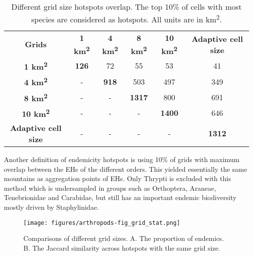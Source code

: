    \begin{table}[]
    \caption{Different grid size hotspots overlap. The top 10\% of cells with most species are considered as hotspots. All units are in km\textsuperscript{2}.}
\begin{tabular}{cccccc}
\textbf{Grids}              & \textbf{1 km\textsuperscript{2}} & \textbf{4 km\textsuperscript{2}} & \textbf{8 km\textsuperscript{2}} & \textbf{10 km\textsuperscript{2}} & \textbf{Adaptive cell size} \\
\textbf{1 km\textsuperscript{2}}              & \textbf{126}   & 72             & 55             & 53              & 41                          \\
\textbf{4 km\textsuperscript{2}}              & -              & \textbf{918}   & 503            & 497             & 349                         \\
\textbf{8 km\textsuperscript{2}}              & -              & -              & \textbf{1317}  & 800             & 691                         \\
\textbf{10 km\textsuperscript{2}}             & -              & -              & -              & \textbf{1400}   & 646                         \\
\textbf{Adaptive cell size} & -              & -              & -              & -               & \textbf{1312}              
\end{tabular}
\label{table:arthropods-tableS2}
\end{table}

   Another definition of endemicity hotspots is using 10\% of grids with maximum
overlap between the EHs of the different orders.
This yielded essentially the same mountains as aggregation points of EHs.
Only Thrypti is excluded with this method which is undersampled in groups such as
Orthoptera, Araneae, Tenebrionidae and Carabidae, but still has an important
endemic biodiversity mostly driven by Staphylinidae.

   \begin{figure}[htb!]
      \centering
      \texttt{[image: figures/arthropods-fig\_grid\_stat.png]}
      \caption[Comparisons of proportions of endemics across grid sizes hotspots]{Comparisons of different grid sizes. A. The proportion of endemics. B. The Jaccard similarity across hotspots with the same grid size.}
      \label{fig:arthropods-different-hotposts-stat}
   \end{figure}

